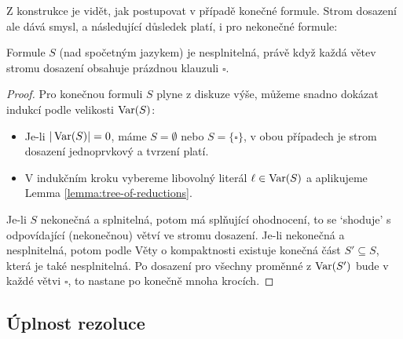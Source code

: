 Z konstrukce je vidět, jak postupovat v případě konečné formule. Strom dosazení ale dává smysl, a následující důsledek platí, i pro nekonečné formule:


\begin{corollary}
    Formule $S$ (nad spočetným jazykem) je nesplnitelná, právě když každá větev stromu dosazení obsahuje prázdnou klauzuli $\square$.
\end{corollary}

\begin{proof}
    Pro konečnou formuli $S$ plyne z diskuze výše, můžeme snadno dokázat indukcí podle velikosti $\operatorname{Var}(S)$: 
    \begin{itemize}
        \item Je-li $|\operatorname{Var}(S)|=0$, máme $S=\emptyset$ nebo $S=\{\square\}$, v obou případech je strom dosazení jednoprvkový a tvrzení platí. 
        \item V indukčním kroku vybereme libovolný literál $\ell\in\operatorname{Var}(S)$ a aplikujeme Lemma \ref{lemma:tree-of-reductions}.
    \end{itemize} 
Je-li $S$ nekonečná a splnitelná, potom má splňující ohodnocení, to se `shoduje' s odpovídající (nekonečnou) větví ve stromu dosazení. Je-li nekonečná a nesplnitelná, potom podle Věty o kompaktnosti existuje konečná část $S'\subseteq S$, která je také nesplnitelná. Po dosazení pro všechny proměnné z $\operatorname{Var}(S')$ bude v každé větvi $\square$, to nastane po konečně mnoha krocích.
\end{proof}

\subsection{Úplnost rezoluce}

